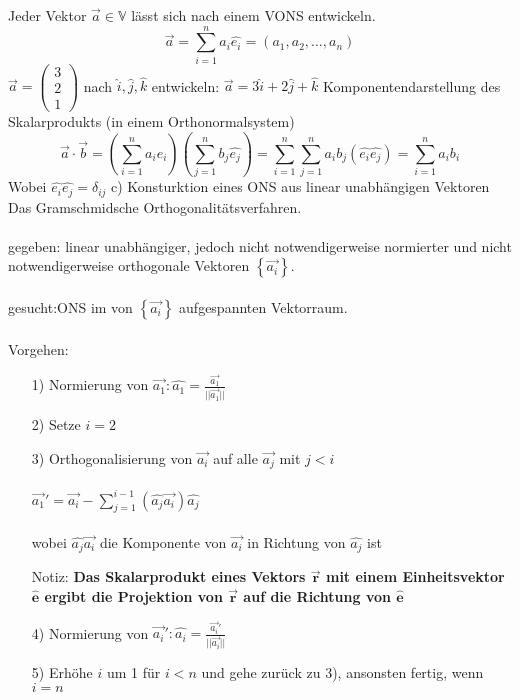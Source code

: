 \documentclass{article}
\begin{document}
Jeder Vektor $\vec{a} \in \mathbb{V}$ lässt sich nach einem VONS entwickeln.
\begin{equation*}
    \vec{a}=\sum_{i=1}^{n}a_i\hat{e_i}=\left(a_1,a_2,\dots,a_n\right)
\end{equation*}
$\vec{a}=\left(\begin{array}{c}
    3 \\ 2 \\ 1
\end{array}\right)$ nach $\hat{i},\hat{j},\hat{k}$ entwickeln: $\vec{a}=3\hat{i}+2\hat{j}+\hat{k}$
Komponentendarstellung des Skalarprodukts (in einem Orthonormalsystem)\\
\begin{equation*}
    \vec{a}\cdot\vec{b}=\left(\sum_{i=1}^{n}a_i\hat{e_i}\right)\left(\sum_{j=1}^{n}b_j\hat{e_j}\right)=\sum_{i=1}^{n}\sum_{j=1}^{n}a_ib_j(\hat{e_i}\hat{e_j}) = \sum_{i=1}^{n}a_ib_i
\end{equation*}
Wobei $\hat{e_i}\hat{e_j} = \delta_{ij}$
c) Konsturktion eines ONS aus linear unabhängigen Vektoren\\
Das Gramschmidsche Orthogonalitätsverfahren.\\\\
gegeben: linear unabhängiger, jedoch nicht notwendigerweise normierter und nicht notwendigerweise orthogonale Vektoren $\left\{\vec{a_i}\right\}$.\\\\
gesucht:ONS im von $\left\{\vec{a_i}\right\}$ aufgespannten Vektorraum.\\\\
Vorgehen:\\
\begin{itemize}
    \item[1)] Normierung von $\vec{a_1}: \hat{a_1}=\frac{\vec{a_1}}{||\vec{a_1}||}$
    \item[2)] Setze $i=2$
    \item[3)] Orthogonalisierung von $\vec{a_i}$ auf alle $\vec{a_j}$ mit $j < i$\\\\
                $\vec{a_1}'=\vec{a_i}-\sum_{j=1}^{i-1}\left(\hat{a_j}\vec{a_i}\right)\hat{a_j}$\\\\wobei $\hat{a_j}\vec{a_i}$ die Komponente von $\vec{a_i}$ in Richtung von $\hat{a_j}$ ist
\begin{center}
    Notiz: \textbf{Das Skalarprodukt eines Vektors $\vec{\mathbf{r}}$ mit einem Einheitsvektor $\hat{\mathbf{e}}$ ergibt die Projektion von $\vec{\mathbf{r}}$ auf die Richtung von $\hat{\mathbf{e}}$}
\end{center}
    \item[4)] Normierung von $\vec{a_i}': \hat{a_i}=\frac{\vec{a_i}'}{||\vec{a_i}||}$
    \item[5)] Erhöhe $i$ um 1 für $i < n$ und gehe zurück zu 3), ansonsten fertig, wenn $i=n$ 
\end{itemize}
\end{document}
